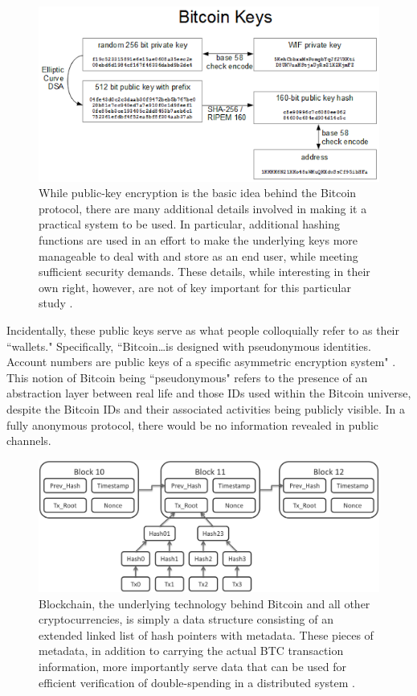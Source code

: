 \documentclass{article}
\begin{document}
\begin{figure}
    \centering
    \includegraphics[width=.75\textwidth]{address.png}
    \caption[Bitcoin Public-Key Wallets]{While public-key encryption is the basic idea behind the Bitcoin protocol, there are many additional details involved in making it a practical system to be used. In particular, additional hashing functions are used in an effort to make the underlying keys more manageable to deal with and store as an end user, while meeting sufficient security demands. These details, while interesting in their own right, however, are not of key important for this particular study \cite{public-key}.}
    \label{fig:address}
\end{figure}

Incidentally, these public keys serve as what people colloquially refer to as their ``wallets." Specifically, ``Bitcoin\dots is designed with pseudonymous identities. Account numbers are public keys of a specific asymmetric encryption system" \cite{laundering}. This notion of Bitcoin being ``pseudonymous" refers to the presence of an abstraction layer between real life and those IDs used within the Bitcoin universe, despite the Bitcoin IDs and their associated activities being publicly visible. In a fully anonymous protocol, there would be no information revealed in public channels.

\begin{figure}
    \centering
    \includegraphics[width=.75\textwidth]{blockchain.png}
    \caption[Blockchain Data Structure]{Blockchain, the underlying technology behind Bitcoin and all other cryptocurrencies, is simply a data structure consisting of an extended linked list of hash pointers with metadata. These pieces of metadata, in addition to carrying the actual BTC transaction information, more importantly serve data that can be used for efficient verification of double-spending in a distributed system \cite{blockchain-img}.}
    \label{fig:blockchain}
\end{figure}
\end{document}
